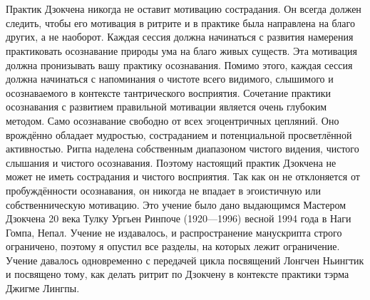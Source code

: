 \\ \\ Практик Дзокчена никогда не оставит мотивацию сострадания. Он всегда должен следить, чтобы его мотивация в ритрите и в практике была направлена на благо других, а не наоборот. Каждая сессия должна начинаться с развития намерения практиковать осознавание природы ума на благо живых существ. Эта мотивация должна пронизывать вашу практику осознавания. Помимо этого, каждая сессия должна начинаться с напоминания о чистоте всего видимого, слышимого и осознаваемого в контексте тантрического восприятия. Сочетание практики осознавания с развитием правильной мотивации является очень глубоким методом. Само осознавание свободно от всех эгоцентричных цепляний. Оно врождённо обладает мудростью, состраданием и потенциальной просветлённой активностью. Ригпа наделена собственным диапазоном чистого видения, чистого слышания и чистого осознавания. Поэтому настоящий практик Дзокчена не может не иметь сострадания и чистого восприятия. Так как он не отклоняется от пробуждённости осознавания, он никогда не впадает в эгоистичную или собственническую мотивацию.
\scriptsize
Это учение было дано выдающимся Мастером Дзокчена 20 века Тулку Ургьен Ринпоче (1920—1996) весной 1994 года в Наги Гомпа, Непал. Учение не издавалось, и распространение манускрипта строго ограничено, поэтому я опустил все разделы, на которых лежит ограничение. Учение давалось одновременно с передачей цикла посвящений Лонгчен Ньингтик и посвящено тому, как делать ритрит по Дзокчену в контексте практики тэрма Джигме Лингпы.
\normalsize
